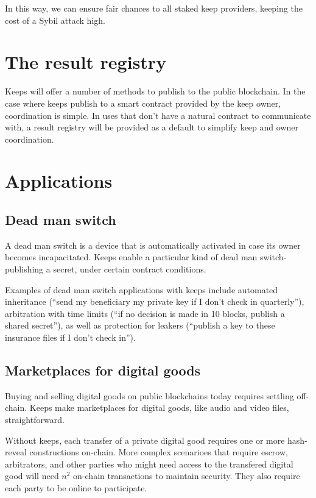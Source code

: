 \documentclass[11pt]{article}
\begin{document}
In this way, we can ensure fair chances to all staked keep providers,
keeping the cost of a Sybil attack high.

\section{The result registry}

Keeps will offer a number of methods to publish to the public
blockchain. In the case where keeps publish to a smart contract
provided by the keep owner, coordination is simple. In uses that don't
have a natural contract to communicate with, a result registry will be
provided as a default to simplify keep and owner coordination.

\section{Applications}
\label{applications}

\subsection{Dead man switch}

A dead man switch is a device that is automatically activated in case
its owner becomes incapacitated. Keeps enable a particular kind of
dead man switch- publishing a secret, under certain contract
conditions.

Examples of dead man switch applications with keeps include automated
inheritance (``send my beneficiary my private key if I don't check in
quarterly''), arbitration with time limits (``if no decision is made in
10 blocks, publish a shared secret''), as well as protection for
leakers (``publish a key to these insurance files if I don't check
in'').

\subsection{Marketplaces for digital goods}

Buying and selling digital goods on public blockchains today requires
settling off-chain. Keeps make marketplaces for digital goods, like
audio and video files, straightforward.

Without keeps, each transfer of a private digital good requires one or
more hash-reveal constructions on-chain. More complex scenarioes
that require escrow, arbitrators, and other parties who might need
access to the transfered digital good will need ${n^2}$ on-chain
transactions to maintain security. They also require each party to be
online to participate.
\end{document}
